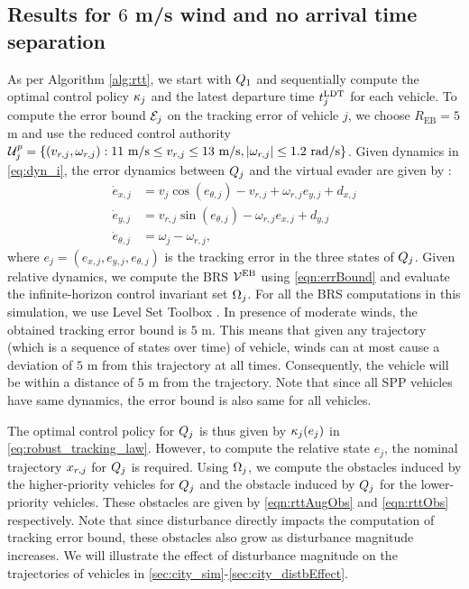 \subsection{Results for $6$ m/s wind and no arrival time separation\label{sec:city_simResults}}
As per Algorithm \ref{alg:rtt}, we start with $Q_1$ and sequentially compute the optimal control policy $\kappa_j$ and the latest departure time $t^\text{LDT}_j$ for each vehicle. To compute the error bound $\mathcal{E}_j$ on the tracking error of vehicle $j$, we choose $R_{\text{EB}} = 5$ m and use the reduced control authority $\mathcal{U}^p_j = \{(v_{r,j}, \omega_{r,j}): 11 \text{ m/s} \leq v_{r,j} \leq 13 \text{ m/s}, |\omega_{r,j}| \leq 1.2 \text{ rad/s}\}$. Given dynamics in \eqref{eq:dyn_i}, the error dynamics between $Q_j$ and the virtual evader are given by \cite{Mitchell05}:
\begin{equation}
\label{eq:reldyn}
\begin{aligned}
\dot{e}_{x,j} &= v_{j} \cos(e_{\theta,j}) - v_{r,j} + \omega_{r,j}{e}_{y,j} + d_{x,j}\\
\dot{e}_{y,j} &= v_{r,j}\sin(e_{\theta,j}) - \omega_{r,j}{e}_{x,j} + d_{y,j}\\
\dot{e}_{\theta,j} &= \omega_{j} - \omega_{r,j},
\end{aligned}
\end{equation}    
where $e_j = ({e}_{x,j}, {e}_{y,j}, {e}_{\theta,j})$ is the tracking error in the three states of $Q_j$. Given relative dynamics, we compute the BRS $\mathcal{V}^{\text{EB}}$ using \eqref{eqn:errBound} and evaluate the infinite-horizon control invariant set $\Omega_j$. For all the BRS computations in this simulation, we use Level Set Toolbox \cite{Mitchell07b}. In presence of moderate winds, the obtained tracking error bound is $5$ m. This means that given any trajectory (which is a sequence of states over time) of vehicle, winds can at most cause a deviation of $5$ m from this trajectory at all times. Consequently, the vehicle will be within a distance of $5$ m from the trajectory. Note that since all SPP vehicles have same dynamics, the error bound is also same for all vehicles. 

The optimal control policy for $Q_j$ is thus given by $\kappa_j(e_j)$ in \eqref{eq:robust_tracking_law}. However, to compute the relative state $e_j$, the nominal trajectory $x_{r,j}$ for $Q_j$ is required. Using $\Omega_j$, we compute the obstacles induced by the higher-priority vehicles for $Q_j$ and the obstacle induced by $Q_j$ for the lower-priority vehicles. These obstacles are given by \eqref{eqn:rttAugObs} and \eqref{eqn:rttObs} respectively. Note that since disturbance directly impacts the computation of tracking error bound, these obstacles also grow as disturbance magnitude increases. We will illustrate the effect of disturbance magnitude on the trajectories of vehicles in \ref{sec:city_sim}-\ref{sec:city_distbEffect}.

